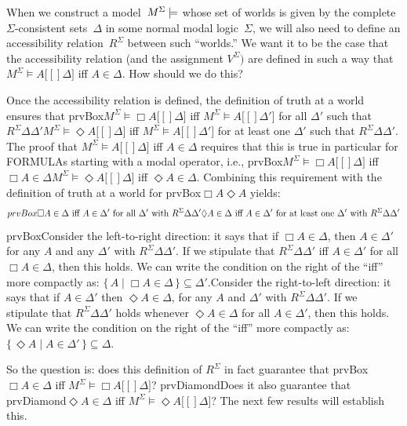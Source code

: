 \documentclass[10pt,a4paper]{article}
\newcommand*{\olup}[1]{\MakeUppercase{#1}}
\theoremstyle{plain}
\theoremstyle{definition}
\theoremstyle{remark}
\newenvironment{explain}{}{}
\providecommand{\mSat}[3]{\ensuremath{#1 \models #2[#3]}}
\providecommand{\mModel}[2]{\ensuremath{#1 \models #2}}
\providecommand{\iftag}[1]{#1}
\providecommand{\Setabs}[2]{\{\, #1 \mid #2 \,\}}
\providecommand{\iftag}{}
\begin{document}
\begin{explain}
When we construct a model~$\mModel{M^\Sigma}$ whose set of worlds is
given by the complete $\Sigma$-consistent sets~$\Delta$ in some normal
modal logic~$\Sigma$, we will also need to define an accessibility
relation~$R^\Sigma$ between such ``worlds.'' We want it to be the case
that the accessibility relation (and the assignment $V^\Sigma)$ are
defined in such a way that $\mSat{M^\Sigma}{A}[\Delta]$ iff $A \in
\Delta$. How should we do this?

Once the accessibility relation is defined, the definition of truth at
a world ensures that \iftag{prvBox}{$\mSat{M^\Sigma}{\Box A}[\Delta]$
  iff $\mSat{M^\Sigma}{A}[\Delta']$ for all $\Delta'$ such that
  $R^\Sigma\Delta\Delta'$}{$\mSat{M^\Sigma}{\Diamond A}[\Delta]$ iff
  $\mSat{M^\Sigma}{A}[\Delta']$ for at least one $\Delta'$ such that
  $R^\Sigma\Delta\Delta'$}.  The proof that
$\mSat{M^\Sigma}{A}[\Delta]$ iff $A \in \Delta$ requires that this
is true in particular for \olup{formula}s starting with a modal operator,
i.e., \iftag{prvBox}{$\mSat{M^\Sigma}{\Box A}[\Delta]$ iff $\Box A
  \in \Delta$}{$\mSat{M^\Sigma}{\Diamond A}[\Delta]$ iff $\Diamond A
  \in \Delta$}. Combining this requirement with the definition of
truth at a world for \iftag{prvBox}{$\Box A$}{$\Diamond A$} yields:
\[
\iftag{prvBox}{%
  \Box A \in \Delta \text{ iff } A \in \Delta' \text{
    for all $\Delta'$ with } R^\Sigma\Delta\Delta'}{%
  \Diamond A \in \Delta \text{ iff } A \in \Delta' \text{ for at
    least one } \Delta' \text{ with } R^\Sigma\Delta\Delta'}
\]
\iftag{prvBox}{Consider the left-to-right direction: it says that if
  $\Box A \in \Delta$, then $A \in \Delta'$ for any $A$ and any
  $\Delta'$ with $R^\Sigma\Delta\Delta'$. If we stipulate that
  $R^\Sigma\Delta\Delta'$ iff $A \in \Delta'$ for all $\Box A \in
  \Delta$, then this holds. We can write the condition on the right of
  the ``iff'' more compactly as: $\Setabs{A}{\Box A \in \Delta}
  \subseteq \Delta'$.}{Consider the right-to-left direction: it says
  that if $A \in \Delta'$ then $\Diamond A \in \Delta$, for any $A$
  and $\Delta'$ with $R^\Sigma\Delta\Delta'$. If we stipulate that
  $R^\Sigma\Delta\Delta'$ holds whenever $\Diamond A \in \Delta$ for
  all $A \in \Delta'$, then this holds.  We can write the condition
  on the right of the ``iff'' more compactly as:
  $\Setabs{\Diamond A}{A \in \Delta'} \subseteq \Delta$.}

So the question is: does this definition of $R^\Sigma$ in fact
guarantee that \iftag{prvBox}{$\Box A \in \Delta$ iff
  $\mSat{M^\Sigma}{\Box A}[\Delta]$? \iftag{prvDiamond}{Does it also
    guarantee that }{}}{}\iftag{prvDiamond}{$\Diamond A \in \Delta$
  iff $\mSat{M^\Sigma}{\Diamond A}[\Delta]$?}{} The next few results
will establish this.
\end{explain}
\end{document}
